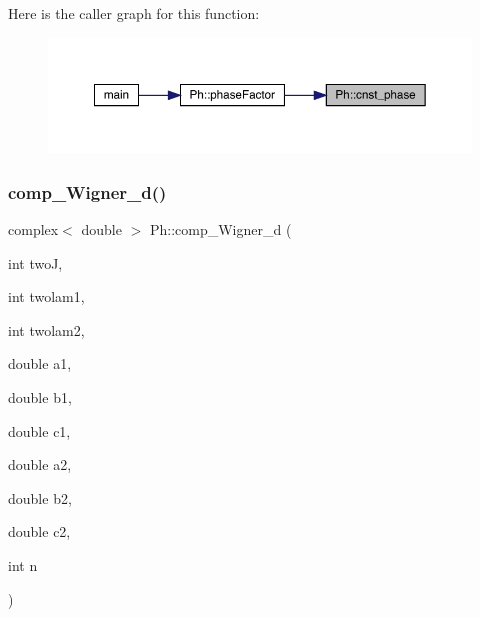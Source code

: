 Here is the caller graph for this function\+:
\nopagebreak
\begin{figure}[H]
\begin{center}
\leavevmode
\includegraphics[width=350pt]{d6/d3c/namespacePh_ac0bb2f4b2888c7c304cb6fcb1b5a7ce2_icgraph}
\end{center}
\end{figure}
\mbox{\label{namespacePh_a47fd4e2846a9ce86464940bc5f4cccf8}} 
\subsubsection{\texorpdfstring{comp\_Wigner\_d()}{comp\_Wigner\_d()}}
{\footnotesize\ttfamily complex$<$ double $>$ Ph\+::comp\+\_\+\+Wigner\+\_\+d (\begin{DoxyParamCaption}\item[{int}]{twoJ,  }\item[{int}]{twolam1,  }\item[{int}]{twolam2,  }\item[{double}]{a1,  }\item[{double}]{b1,  }\item[{double}]{c1,  }\item[{double}]{a2,  }\item[{double}]{b2,  }\item[{double}]{c2,  }\item[{int}]{n }\end{DoxyParamCaption})}

